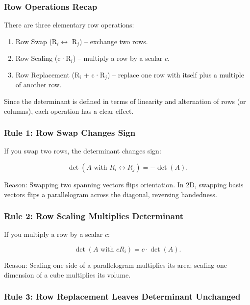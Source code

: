 \documentclass[
  letterpaper,
  DIV=11,
  numbers=noendperiod]{scrreprt}
\providecommand{\tightlist}{%
  \setlength{\itemsep}{0pt}\setlength{\parskip}{0pt}}
\begin{document}
\subsubsection{Row Operations Recap}\label{row-operations-recap}

There are three elementary row operations:

\begin{enumerate}
\def\labelenumi{\arabic{enumi}.}
\tightlist
\item
  Row Swap (R\(_i \leftrightarrow\) R\(_j\)) -- exchange two rows.
\item
  Row Scaling (c·R\(_i\)) -- multiply a row by a scalar \(c\).
\item
  Row Replacement (R\(_i\) + c·R\(_j\)) -- replace one row with itself
  plus a multiple of another row.
\end{enumerate}

Since the determinant is defined in terms of linearity and alternation
of rows (or columns), each operation has a clear effect.

\subsubsection{Rule 1: Row Swap Changes
Sign}\label{rule-1-row-swap-changes-sign}

If you swap two rows, the determinant changes sign:

\[
\det(A \text{ with } R_i \leftrightarrow R_j) = -\det(A).
\]

Reason: Swapping two spanning vectors flips orientation. In 2D, swapping
basis vectors flips a parallelogram across the diagonal, reversing
handedness.

\subsubsection{Rule 2: Row Scaling Multiplies
Determinant}\label{rule-2-row-scaling-multiplies-determinant}

If you multiply a row by a scalar \(c\):

\[
\det(A \text{ with } cR_i) = c \cdot \det(A).
\]

Reason: Scaling one side of a parallelogram multiplies its area; scaling
one dimension of a cube multiplies its volume.

\subsubsection{Rule 3: Row Replacement Leaves Determinant
Unchanged}\label{rule-3-row-replacement-leaves-determinant-unchanged}
\end{document}
